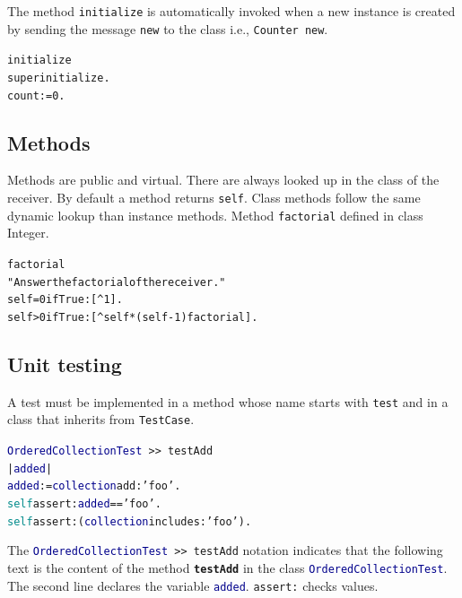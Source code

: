 \documentclass[notumble]{leaflet}
\makeatletter
\newcommand{\ct}[1]{{\textsf{#1}}\xspace}
\newenvironment{displaycode}{%
     \par
     \hspace{1.5em}\begin{minipage}{\linewidth}
       \begin{alltt}\small}{
       \end{alltt}
     \end{minipage}
     \par}
\newcommand{\code}[1]{\foreignlanguage{english}{\texttt{#1}}}
\makeatother
\begin{document}
The method \code{initialize} is automatically invoked when a new instance is created by sending the message \code{new} to the class i.e., \code{Counter new}. 

\begin{displaycode}
initialize 
    super initialize.
    count := 0. 
\end{displaycode}

\subsection{Methods}
Methods are public and virtual. There are always looked up in the class of the receiver. By default a method returns \code{self}. 
Class methods follow the same dynamic lookup than instance methods. 
Method \code{factorial} defined in class \ct{Integer}. 

\begin{displaycode}
factorial
   "Answer the factorial of the receiver."
   self = 0 ifTrue: [^ 1].
   self > 0 ifTrue: [^ self * (self - 1) factorial].
\end{displaycode}




\subsection{Unit testing}
A test must be implemented in a method whose name starts with \code{test} and in a class that
inherits from \code{TestCase}.

\begin{displaycode}
\textcolor{darkBlue}{OrderedCollectionTest}\,>>\,testAdd
  | \textcolor{darkBlue}{added} |
  \textcolor{darkBlue}{added} := \textcolor{darkBlue}{collection} add: \textcolor{string}{'foo'}.
  \textcolor{darkCyan}{self} assert: \textcolor{darkBlue}{added} == \textcolor{string}{'foo'}.
  \textcolor{darkCyan}{self} assert: (\textcolor{darkBlue}{collection} includes: \textcolor{string}{'foo'}).
\end{displaycode}

The \code{\textcolor{darkBlue}{OrderedCollectionTest}\,>{}>\,testAdd}
notation indicates that the following text is the content of the
method \code{\textbf{testAdd}} in the class
\code{\textcolor{darkBlue}{OrderedCollectionTest}}. The second line
declares the variable \code{\textcolor{darkBlue}{added}}. \code{assert:} checks values.
\end{document}
